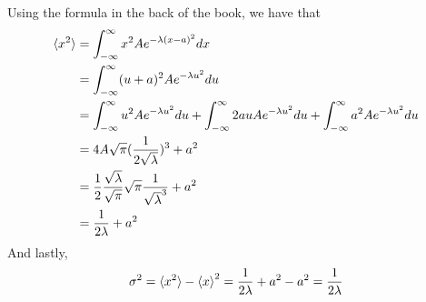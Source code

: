 \documentclass{article}
\begin{document}
\begin{enumerate}[label=(\alph*)]
      Using the formula in the back of the book, we have that
      \begin{align*}
        \braket{x^2} &= \int_{-\infty}^\infty x^2 Ae^{-\lambda (x - a)^2} dx \\
                     &= \int_{-\infty}^\infty (u + a)^2 Ae^{-\lambda u^2} du \\
                     &= \int_{-\infty}^\infty u^2 A e^{-\lambda u^2}du + \int_{-\infty}^\infty 2auAe^{-\lambda u^2}du + \int_{-\infty}^\infty a^2Ae^{-\lambda u^2}du \\
                     &= 4A\sqrt{\pi}(\frac{1}{2\sqrt{\lambda}})^3  + a^2 \\
                     &= \frac{1}{2} \frac{\sqrt\lambda}{\sqrt\pi} \sqrt{\pi} \frac{1}{\sqrt{\lambda}^3} + a^2 \\
                     &= \frac{1}{2 \lambda} + a^2
      \end{align*}
      And lastly, 
      \begin{align*}
        \sigma^2 = \braket{x^2} - \braket{x}^2 = \frac{1}{2\lambda} + a^2 - a^2 = \frac{1}{2\lambda}
      \end{align*}
  \end{enumerate}
\end{document}
